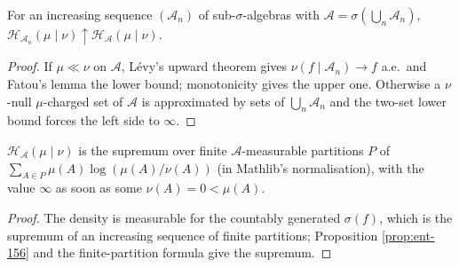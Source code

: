 \begin{proposition}[Georgii (15.6)]
    \label{prop:ent-156}
    \leanok

    For an increasing sequence $(\mathcal{A}_n)$ of sub-$\sigma$-algebras with
    $\mathcal{A} = \sigma(\bigcup_n \mathcal{A}_n)$,
    $\mathcal{H}_{\mathcal{A}_n}(\mu\mid\nu) \uparrow \mathcal{H}_{\mathcal{A}}(\mu\mid\nu)$.
\end{proposition}
\begin{proof}
    \leanok

    If $\mu \ll \nu$ on $\mathcal{A}$, Lévy's upward theorem gives
    $\nu(f \mid \mathcal{A}_n) \to f$ a.e.\ and Fatou's lemma the lower bound; monotonicity gives
    the upper one. Otherwise a $\nu$-null $\mu$-charged set of $\mathcal{A}$ is approximated by
    sets of $\bigcup_n \mathcal{A}_n$ and the two-set lower bound forces the left side to
    $\infty$.
\end{proof}

\begin{corollary}[Georgii (15.7)]
    \label{cor:ent-157}
    \leanok

    $\mathcal{H}_{\mathcal{A}}(\mu \mid \nu)$ is the supremum over finite $\mathcal{A}$-measurable
    partitions $P$ of $\sum_{A \in P} \mu(A)\log(\mu(A)/\nu(A))$ (in Mathlib's normalisation),
    with the value $\infty$ as soon as some $\nu(A) = 0 < \mu(A)$.
\end{corollary}
\begin{proof}
    \leanok

    The density is measurable for the countably generated $\sigma(f)$, which is the supremum of
    an increasing sequence of finite partitions; Proposition \ref{prop:ent-156} and the
    finite-partition formula give the supremum.
\end{proof}

